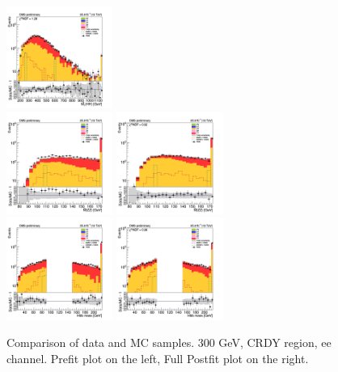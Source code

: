 \begin{figure}[tbp]
\begin{center}
    \includegraphics[width=0.31\textwidth]{figures/ee_300_april18/hhMt_ee_CRDY_FullPostfit_plot_apr18.png}\\
    \includegraphics[width=0.31\textwidth]{figures/ee_300_april18/hmass0_ee_CRDY_prefit_plot_apr18.png}
    \includegraphics[width=0.31\textwidth]{figures/ee_300_april18/hmass0_ee_CRDY_FullPostfit_plot_apr18.png}\\
    \includegraphics[width=0.31\textwidth]{figures/ee_300_april18/hmass1_ee_CRDY_prefit_plot_apr18.png}
    \includegraphics[width=0.31\textwidth]{figures/ee_300_april18/hmass1_ee_CRDY_FullPostfit_plot_apr18.png}\\
    \caption{Comparison of data and MC samples. 300 GeV, CRDY region, ee channel. Prefit plot on the left,           Full Postfit plot on the right.}
    \label{fig:MCcomparisons_ee_low_CRDY}
  \end{center}
\end{figure}

